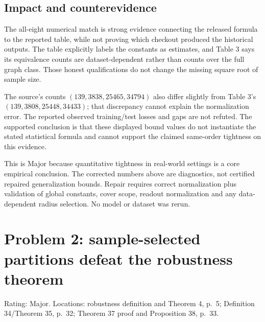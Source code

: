 \documentclass[10pt]{article}
\begin{document}
\subsection*{Impact and counterevidence}
The all-eight numerical match is strong evidence connecting the released formula to the reported table, while not proving which checkout produced the historical outputs. The table explicitly labels the constants as estimates, and Table 3 says its equivalence counts are dataset-dependent rather than counts over the full graph class. Those honest qualifications do not change the missing square root of sample size.\par
The source’s counts \((139,\allowbreak 3838,\allowbreak 25465,\allowbreak 34794)\) also differ slightly from Table 3’s \((139,\allowbreak 3808,\allowbreak 25448,\allowbreak 34433)\); that discrepancy cannot explain the normalization error. The reported observed training/test losses and gaps are not refuted. The supported conclusion is that these displayed bound values do not instantiate the stated statistical formula and cannot support the claimed same-order tightness on this evidence.\par
This is Major because quantitative tightness in real-world settings is a core empirical conclusion. The corrected numbers above are diagnostics, not certified repaired generalization bounds. Repair requires correct normalization plus validation of global constants, cover scope, readout normalization and any data-dependent radius selection. No model or dataset was rerun.\par
\section*{Problem 2: sample-selected partitions defeat the robustness theorem}
Rating: Major. Locations: robustness definition and Theorem 4, p. 5; Definition 34/Theorem 35, p. 32; Theorem 37 proof and Proposition 38, p. 33.\par
\end{document}
